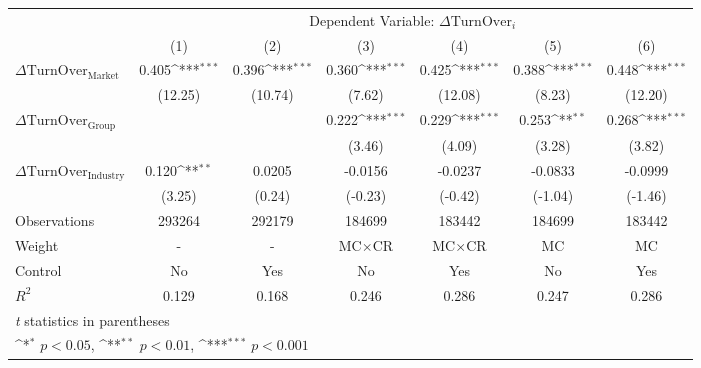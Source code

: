{
\def\sym#1{\ifmmode^{#1}\else\(^{#1}\)\fi}
\begin{tabular}{l*{6}{c}}
\hline\hline
                    &\multicolumn{6}{c}{Dependent Variable: $\Delta \text{TurnOver}_{i} $ }                                                             \\\cmidrule(lr){2-7}
                    &\multicolumn{1}{c}{(1)}         &\multicolumn{1}{c}{(2)}         &\multicolumn{1}{c}{(3)}         &\multicolumn{1}{c}{(4)}         &\multicolumn{1}{c}{(5)}         &\multicolumn{1}{c}{(6)}         \\
\hline
 $ \Delta \text{TurnOver}_{\text{Market}} $ &       0.405\sym{***}&       0.396\sym{***}&       0.360\sym{***}&       0.425\sym{***}&       0.388\sym{***}&       0.448\sym{***}\\
                    &     (12.25)         &     (10.74)         &      (7.62)         &     (12.08)         &      (8.23)         &     (12.20)         \\
[1em]
 $ \Delta \text{TurnOver}_{\text{Group}} $ &                     &                     &       0.222\sym{***}&       0.229\sym{***}&       0.253\sym{**} &       0.268\sym{***}\\
                    &                     &                     &      (3.46)         &      (4.09)         &      (3.28)         &      (3.82)         \\
[1em]
 $ \Delta \text{TurnOver}_{\text{Industry}} $ &       0.120\sym{**} &      0.0205         &     -0.0156         &     -0.0237         &     -0.0833         &     -0.0999         \\
                    &      (3.25)         &      (0.24)         &     (-0.23)         &     (-0.42)         &     (-1.04)         &     (-1.46)         \\
\hline
Observations        &      293264         &      292179         &      184699         &      183442         &      184699         &      183442         \\
Weight              &           -         &           -         & $ \text{MC} \times \text{CR} $          & $ \text{MC} \times \text{CR} $          & $ \text{MC} $          & $ \text{MC} $          \\
Control             &          No         &         Yes         &          No         &         Yes         &          No         &         Yes         \\
$ R^2 $             &       0.129         &       0.168         &       0.246         &       0.286         &       0.247         &       0.286         \\
\hline\hline
\multicolumn{7}{l}{\footnotesize \textit{t} statistics in parentheses}\\
\multicolumn{7}{l}{\footnotesize \sym{*} \(p<0.05\), \sym{**} \(p<0.01\), \sym{***} \(p<0.001\)}\\
\end{tabular}
}
